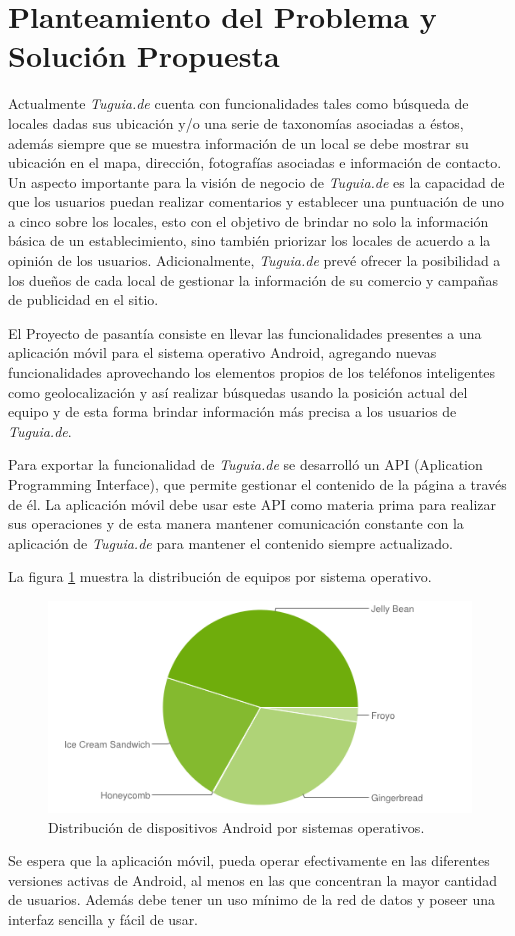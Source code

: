 \section{Planteamiento del Problema y Solución Propuesta} \label{sect:planteamiento_solucion}

Actualmente \textit{Tuguia.de} cuenta con funcionalidades tales como búsqueda de locales dadas sus ubicación y/o una serie de taxonomías asociadas a éstos, además siempre que se muestra información de un local se debe mostrar su ubicación en el mapa, dirección, fotografías asociadas e información de contacto. Un aspecto importante para la visión de negocio de \textit{Tuguia.de} es la capacidad de que los usuarios puedan realizar comentarios y establecer una puntuación de uno a cinco  sobre los locales, esto con el objetivo de brindar no solo la información básica de un establecimiento, sino también priorizar los locales de acuerdo a la opinión de los usuarios. Adicionalmente, \textit{Tuguia.de} prevé ofrecer la posibilidad a los dueños de cada local de gestionar la información de su comercio y campañas de publicidad en el sitio.

El Proyecto de pasantía consiste en llevar las funcionalidades presentes a una aplicación móvil para el sistema operativo Android, agregando nuevas funcionalidades aprovechando los elementos propios de los teléfonos inteligentes como geolocalización y así realizar búsquedas usando la posición actual del equipo y de esta forma brindar información más precisa a los usuarios de \textit{Tuguia.de}.

Para exportar la funcionalidad de \textit{Tuguia.de} se desarrolló un API (Aplication Programming Interface), que permite gestionar el contenido de la página a través de él. La aplicación móvil debe usar este API como materia prima para realizar sus operaciones y de esta manera mantener comunicación constante con la aplicación de \textit{Tuguia.de} para mantener el contenido siempre actualizado.

La figura \ref{fig:AndroidVersion} muestra la distribución de equipos por sistema operativo.  

\begin{figure}[h]
	\begin{center}
		\includegraphics[scale=0.5]{imagenes/chart.png}
	\end{center}
	\caption{
		\label{fig:AndroidVersion}
		Distribución de dispositivos Android por sistemas operativos.
	}
\end{figure}

Se espera que la aplicación móvil, pueda operar efectivamente en las diferentes versiones activas de Android, al menos en las que concentran la mayor cantidad de usuarios. Además debe tener un uso mínimo de la red de datos y poseer una interfaz sencilla y fácil de usar.

